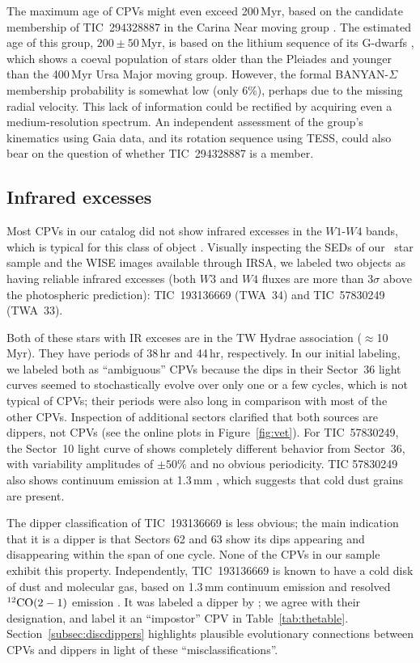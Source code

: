\documentclass[11pt,twocolumn,tighten]{aastex63}
\begin{document}
The maximum age of CPVs might even exceed 200\,Myr, based on the
candidate membership of TIC~294328887 in the Carina Near moving group
\citep{2006ApJ...649L.115Z}.  The estimated age of this group, $200
\pm 50$\,Myr, is based on the lithium sequence of its G-dwarfs
\citep{2006ApJ...649L.115Z}, which shows a coeval population of stars
older than the Pleiades and younger than the 400\,Myr Ursa Major
moving group.  However, the formal BANYAN-$\Sigma$ membership
probability is somewhat low (only 6\%), perhaps due to the missing
radial velocity.  This lack of information could be rectified by
acquiring even a medium-resolution spectrum.  An independent
assessment of the group's kinematics using Gaia data, and its rotation
sequence using TESS, could also bear on the question of whether
TIC~294328887 is a member.


\subsection{Infrared excesses}
\label{subsec:irexcess}

Most CPVs in our catalog did not show infrared excesses in the
$W1$-$W4$ bands, which is typical for this class of object
\citep{2017AJ....153..152S}.  Visually inspecting the SEDs of our
\nallcands\ star sample and the WISE images available through IRSA, we
labeled two objects as having reliable infrared excesses (both $W3$
and $W4$ fluxes are more than 3$\sigma$ above the photospheric
prediction): TIC~193136669 (TWA~34) and TIC~57830249 (TWA~33).

Both of these stars with IR exceses are in the TW Hydrae association
($\approx$10\,Myr).  They have periods of 38\,hr and 44\,hr,
respectively.  In our initial labeling, we labeled both as
``ambiguous'' CPVs because the dips in their Sector~36 light curves
seemed to stochastically evolve over only one or a few cycles, which
is not typical of CPVs; their periods were also long in comparison with
most of the other CPVs.  Inspection of additional sectors clarified
that both sources are dippers, not CPVs (see the online plots in
Figure~\ref{fig:vet}).  For TIC~57830249, the Sector~10 light curve of
shows completely different behavior from Sector~36, with variability
amplitudes of $\pm 50\%$ and no obvious periodicity.  TIC 57830249
also shows continuum emission at 1.3\,mm \citep{2015A&A...582L...5R},
which suggests that cold dust grains are present.

The dipper classification of TIC~193136669 is less obvious; the main
indication that it is a dipper is that Sectors 62 and 63 show its dips
appearing and disappearing within the span of one cycle.  None of the
CPVs in our sample exhibit this property.  Independently, TIC~193136669
is known to have a cold disk of dust and molecular gas, based on
1.3\,mm continuum emission and resolved $^{12}{\rm CO}(2-1)$ emission
\citep{2015A&A...582L...5R}.  It was labeled a dipper by
\citet{2022ApJS..263...14C}; we agree with their designation, and
label it an ``impostor'' CPV in Table~\ref{tab:thetable}.
Section~\ref{subsec:discdippers} highlights plausible evolutionary
connections between CPVs and dippers in light of these
``misclassifications''.
\end{document}
